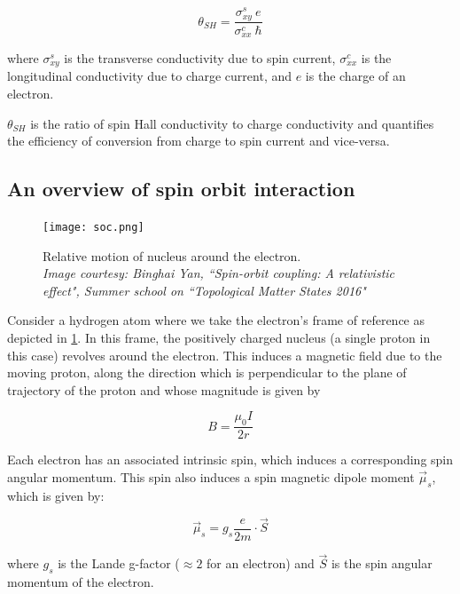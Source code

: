 \begin{equation} \label{eq:sha}
    \theta_{SH} = \frac{\sigma^s_{xy} \: e}{\sigma^c_{xx} \: \hbar}
\end{equation}

where \( \sigma^s_{xy} \) is the transverse conductivity due to spin current, \( \sigma^c_{xx} \) is the longitudinal conductivity due to charge current, and \( e \) is the charge of an electron.

\( \theta_{SH} \) is the ratio of spin Hall conductivity to charge conductivity and quantifies the efficiency of conversion from charge to spin current and vice-versa.

\subsection{An overview of spin orbit interaction}

\begin{figure}[h!]
    \centering
    \texttt{[image: soc.png]}
    \caption{Relative motion of nucleus around the electron.\\ \vspace{0.2cm} \textit{Image courtesy: Binghai Yan, ``Spin-orbit coupling: A relativistic effect", Summer school on ``Topological Matter States 2016"}}
    \label{fig:soc-atom}
\end{figure}

Consider a hydrogen atom where we take the electron's frame of reference as depicted in \cref{fig:soc-atom}.
In this frame, the positively charged nucleus (a single proton in this case) revolves around the electron.
This induces a magnetic field due to the moving proton, along the direction which is perpendicular to the plane of trajectory of the proton and whose magnitude is given by

\begin{equation}
    B = \frac{\mu_0 I}{2r}
\end{equation}

Each electron has an associated intrinsic spin, which induces a corresponding spin angular momentum.
This spin also induces a spin magnetic dipole moment \( \vec{\mu}_s \), which is given by:

\begin{equation} \label{eq:mu_sS}
    \vec{\mu}_s = g_s \frac{e}{2m} \cdot \vec{S}
\end{equation}

where \( g_s \) is the Lande g-factor (\( \approx 2 \) for an electron) and \( \vec{S} \) is the spin angular momentum of the electron.


